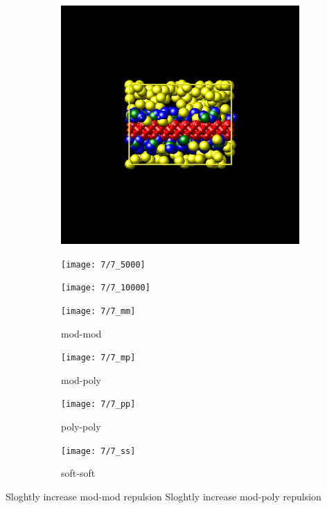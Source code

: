 \documentclass[a4paper]{article}
\begin{document}
\begin{figure}[H]
\begin{subfigure}{0.3\textwidth}
  \centering
  \includegraphics[width=\linewidth,keepaspectratio]{start}
  \caption{}
\end{subfigure}
\begin{subfigure}{0.3\textwidth}
  \centering
  \texttt{[image: 7/7\_5000]}
  \caption{}
\end{subfigure}
\begin{subfigure}{0.3\textwidth}
  \centering
  \texttt{[image: 7/7\_10000]}
  \caption{}
\end{subfigure}
\caption{}
\label{fig_1}
\end{figure}

\begin{figure}[H]
\begin{subfigure}{0.24\textwidth}
  \centering
  \texttt{[image: 7/7\_mm]}
  \caption{mod-mod}
\end{subfigure}
\begin{subfigure}{0.24\textwidth}
  \centering
  \texttt{[image: 7/7\_mp]}
  \caption{mod-poly}
\end{subfigure}
\begin{subfigure}{0.24\textwidth}
  \centering
  \texttt{[image: 7/7\_pp]}
  \caption{poly-poly}
\end{subfigure}
\begin{subfigure}{0.24\textwidth}
  \centering
  \texttt{[image: 7/7\_ss]}
  \caption{soft-soft}
\end{subfigure}
\caption{}
\label{fig_1}
\end{figure}
Sloghtly increase mod-mod repulsion\newline
Sloghtly increase mod-poly repulsion
\end{document}
